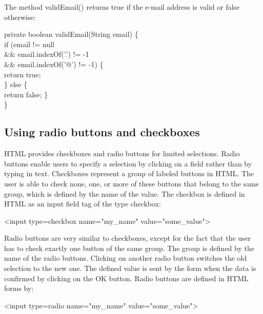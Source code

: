 The method {\meth validEmail()} returns true if the e-mail address is valid or false
otherwise: 

\begin{java}
private boolean validEmail(String email) \{\\
\jtaba if (email != null \\
\jtabc        \&\& email.indexOf('.') != -1 \\
\jtabc        \&\& email.indexOf('@') != -1) \{\\
\jtabb    return true;\\
\jtaba \} else \{\\
\jtabb    return false;
\jtaba\}\\
\}\\
\end{java}


\subsection{Using radio buttons and checkboxes}

HTML provides checkboxes and radio buttons for limited selections.
Radio buttons enable users to specify a selection by clicking on a field
rather than by typing in text. Checkboxes represent a group of labeled
buttons in HTML. The user is able to check none, one, or more of these
buttons that belong to the same group, which is defined by the name of
the value. The checkbox is defined in HTML as an input field tag 
of the type checkbox:

\begin{java}
<input  type=checkbox name="my\_name" value="some\_value">
\end{java}

Radio buttons are very similar to checkboxes, except for the fact that
the user has to check exactly one button of the same group. The group is
defined by the name of the radio buttons. Clicking on another radio button
switches the old selection to the new one. The defined value is sent by
the form when the data is confirmed by clicking on the OK button. Radio
buttons are defined in HTML forms by:

\begin{java}
<input type=radio name="my\_name" value="some\_value">\\
\end{java}

